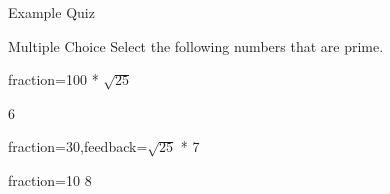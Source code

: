 \documentclass{article}
\begin{document}
\begin{quiz}{Example Quiz}
\begin{multi}[multiple,feedback={abc\\def $\sqrt{2}$}]{Multiple Choice}
Select the following numbers that are prime.
\item[fraction=100]* $\sqrt{25}$
\item 6
\item[fraction=30,feedback={$\sqrt{25}$}]* 7
\item[fraction=10] 8
\end{multi}

\end{quiz}
\end{document}
